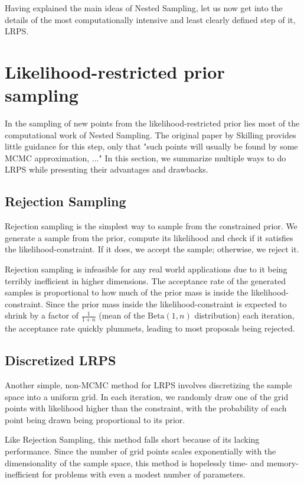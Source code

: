 \documentclass[12pt, a4paper]{report}
\begin{document}
Having explained the main ideas of Nested Sampling, let us now get into the details of the most computationally intensive and least clearly defined step of it, LRPS.

\FloatBarrier
\section{Likelihood-restricted prior sampling}
In the sampling of new points from the likelihood-restricted prior lies most of the computational work of Nested Sampling.
The original paper by Skilling provides little guidance for this step, only that "such points will usually be found by some MCMC approximation, ..." \cite[6]{skilling}
In this section, we summarize multiple ways to do LRPS while presenting their advantages and drawbacks.

\subsection{Rejection Sampling}
Rejection sampling is the simplest way to sample from the constrained prior.
We generate a sample from the prior, compute its likelihood and check if it satisfies the likelihood-constraint.
If it does, we accept the sample; otherwise, we reject it.

Rejection sampling is infeasible for any real world applications due to it being terribly inefficient in higher dimensions.
The acceptance rate of the generated samples is proportional to how much of the prior mass is inside the likelihood-constraint.
Since the prior mass inside the likelihood-constraint is expected to shrink by a factor of $\frac{1}{1+n}$ (mean of the $\textrm{Beta}(1, n)$ distribution) each iteration, the acceptance rate quickly plummets, leading to most proposals being rejected.

\subsection{Discretized LRPS}
Another simple, non-MCMC method for LRPS involves discretizing the sample space into a uniform grid.
In each iteration, we randomly draw one of the grid points with likelihood higher than the constraint, with the probability of each point being drawn being proportional to its prior.

Like Rejection Sampling, this method falls short because of its lacking performance.
Since the number of grid points scales exponentially with the dimensionality of the sample space, this method is hopelessly time- and memory-inefficient for problems with even a modest number of parameters.
\end{document}
